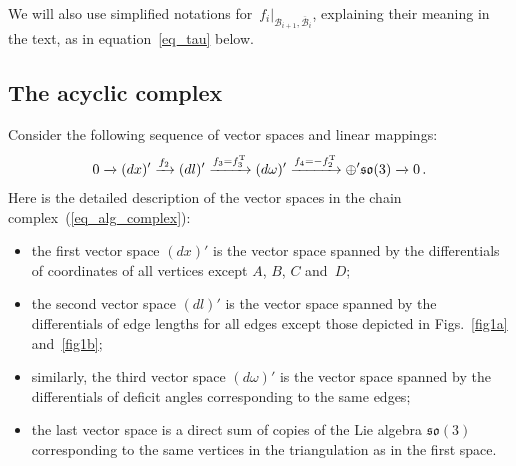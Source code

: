 \documentclass[pdftex]{sigma}
\begin{document}
\begin{remark}\label{rem1B}
We will also use simplif\/ied notations for~$f_i|_{\mathcal B_{i+1}, \overline{\mathcal B}_i}$, explaining their meaning in the text, as in equation~\eqref{eq_tau} below.
\end{remark}

\subsection{The acyclic complex}

Consider the following sequence of vector spaces and linear mappings:
\begin{equation}
0\xrightarrow{} (dx)'\xrightarrow{f_2} (dl)' \xrightarrow{f_3=f_3^{\rm T}}(d\omega)' \xrightarrow{f_4=-f_2^{\rm T}} \oplus' \mathfrak{so}(3) \xrightarrow{} 0\,.
\label{eq_alg_complex}
\end{equation}
Here is the detailed description of the vector spaces in the chain complex~(\ref{eq_alg_complex}):
\begin{itemize}
\itemsep=0pt
  \item the f\/irst vector space $(dx)'$ is the vector space spanned by the dif\/ferentials of coordinates of all vertices except $A$, $B$, $C$ and~$D$;
  \item the second vector space $(dl)'$ is the vector space spanned by the dif\/ferentials of edge lengths for all edges except those depicted in Figs.~\ref{fig1a} and~\ref{fig1b};
  \item similarly, the third vector space $(d\omega)'$ is the vector space spanned by the dif\/ferentials of def\/icit angles corresponding to the same edges;
  \item the last vector space is a direct sum of copies of the Lie algebra $\mathfrak{so}(3)$ corresponding to the same vertices in the triangulation as in the f\/irst space.
\end{itemize}
\end{document}
